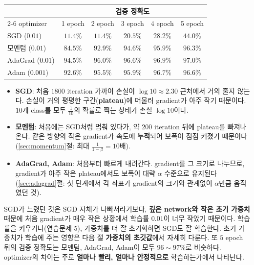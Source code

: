 \documentclass[11pt,a4paper]{article}
\begin{document}
\begin{center}
\begin{tabular}{@{}lccccc@{}}
\toprule
& \multicolumn{5}{c}{검증 정확도} \\
\cmidrule(l){2-6}
optimizer & 1 epoch & 2 epoch & 3 epoch & 4 epoch & 5 epoch \\
\midrule
SGD ($0.01$) & $11.4\%$ & $11.4\%$ & $20.5\%$ & $28.2\%$ & $44.0\%$ \\
모멘텀 ($0.01$) & $84.5\%$ & $92.9\%$ & $94.6\%$ & $95.9\%$ & $96.3\%$ \\
AdaGrad ($0.01$) & $94.5\%$ & $96.0\%$ & $96.6\%$ & $96.9\%$ & $97.0\%$ \\
Adam ($0.001$) & $92.6\%$ & $95.5\%$ & $95.9\%$ & $96.7\%$ & $96.6\%$ \\
\bottomrule
\end{tabular}
\end{center}

\begin{itemize}[leftmargin=1.8em]
\item \textbf{SGD}: 처음 $1800$ iteration 가까이 손실이 $\log10\approx2.30$ 근처에서 거의 줄지 않는다.
손실이 거의 평평한 구간(\textbf{plateau})에 머물러 gradient가 아주 작기 때문이다.
$10$개 class를 모두 $\frac{1}{10}$의 확률로 찍는 상태가 손실 $\log10$이다.
\item \textbf{모멘텀}: 처음에는 SGD처럼 멈춰 있다가, 약 $200$ iteration 뒤에 plateau를 빠져나온다.
같은 방향의 작은 gradient가 속도에 \textbf{누적}되어 보폭이 점점 커졌기 때문이다
(\ref{sec:momentum}절: 최대 $\frac{1}{1-\beta}=10$배).
\item \textbf{AdaGrad, Adam}: 처음부터 빠르게 내려간다.
gradient를 그 크기로 나누므로, gradient가 아주 작은 plateau에서도 보폭이 대략 $\alpha$ 수준으로 유지된다
(\ref{sec:adagrad}절: 첫 단계에서 각 좌표가 gradient의 크기와 관계없이 $\alpha$만큼 움직였던 것).
\end{itemize}

\begin{remarkbox}
SGD가 느렸던 것은 SGD 자체가 나빠서라기보다,
\textbf{깊은 network와 작은 초기 가중치} 때문에 처음 gradient가 매우 작은 상황에서
학습률 $0.01$이 너무 작았기 때문이다.
학습률을 키우거나(연습문제 5), 가중치를 더 잘 초기화하면 SGD도 잘 학습한다.
초기 가중치가 학습에 주는 영향은 다음 절 \textbf{가중치의 초깃값}에서 자세히 다룬다.
또 $5$ epoch 뒤의 검증 정확도는 모멘텀, AdaGrad, Adam이 모두 $96\sim97\%$로 비슷하다.
optimizer의 차이는 주로 \textbf{얼마나 빨리, 얼마나 안정적으로} 학습하는가에서 나타난다.
\end{remarkbox}
\end{document}
